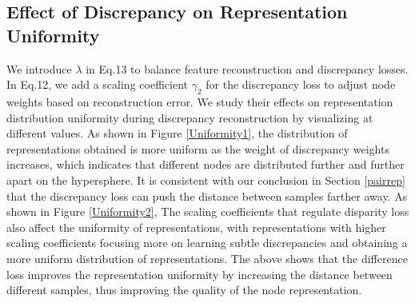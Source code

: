 \documentclass[sigconf]{acmart}
\begin{document}
\subsection{Effect of Discrepancy on Representation Uniformity}
\label{uniformity}
We introduce $\lambda$ in Eq.13 to balance feature reconstruction and discrepancy losses. In Eq.12, we add a scaling coefficient $\gamma_2$ for the discrepancy loss to adjust node weights based on reconstruction error. We study their effects on representation distribution uniformity during discrepancy reconstruction by visualizing at different values. As shown in Figure \ref{Uniformity1}, the distribution of representations obtained is more uniform as the weight of discrepancy weights increases, which indicates that different nodes are distributed further and further apart on the hypersphere. It is consistent with our conclusion in Section \ref{pairrep} that the discrepancy loss can push the distance between samples farther away.
As shown in Figure \ref{Uniformity2}, The scaling coefficients that regulate disparity loss also affect the uniformity of representations, with representations with higher scaling coefficients focusing more on learning subtle discrepancies and obtaining a more uniform distribution of representations. The above shows that the difference loss improves the representation uniformity by increasing the distance between different samples, thus improving the quality of the node representation.
\end{document}

